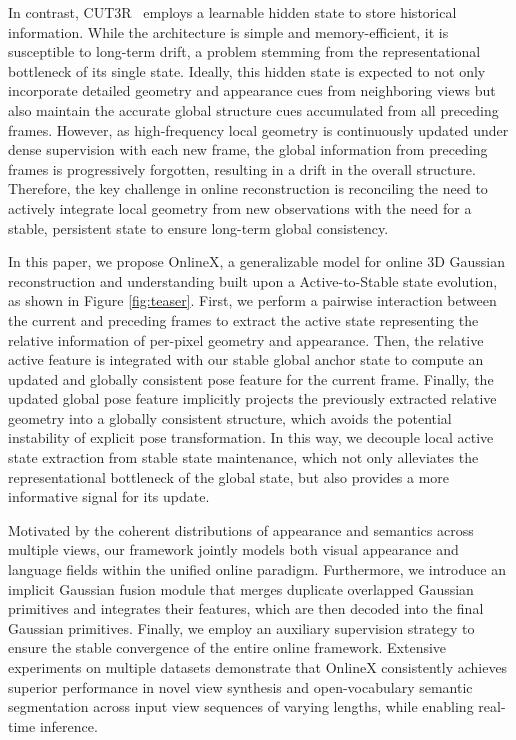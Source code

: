 In contrast, CUT3R~\cite{wang2025continuous} employs a learnable hidden state to store historical information. While the architecture is simple and memory-efficient, it is susceptible to long-term drift, a problem stemming from the representational bottleneck of its single state. Ideally, this hidden state is expected to not only incorporate detailed geometry and appearance cues from neighboring views but also maintain the accurate global structure cues accumulated from all preceding frames. However, as high-frequency local geometry is continuously updated under dense supervision with each new frame, the global information from preceding frames is progressively forgotten, resulting in a drift in the overall structure. Therefore, the key challenge in online reconstruction is reconciling the need to actively integrate local geometry from new observations with the need for a stable, persistent state to ensure long-term global consistency.

In this paper, we propose OnlineX, a generalizable model for online 3D Gaussian reconstruction and understanding built upon a Active-to-Stable state evolution, as shown in Figure \ref{fig:teaser}. First, we perform a pairwise interaction between the current and preceding frames to extract the active state representing the relative information of per-pixel geometry and appearance. Then, the relative active feature is integrated with our stable global anchor state to compute an updated and globally consistent pose feature for the current frame. Finally, the updated global pose feature implicitly projects the previously extracted relative geometry into a globally consistent structure, which avoids the potential instability of explicit pose transformation. In this way, we decouple local active state extraction from stable state maintenance, which not only alleviates the representational bottleneck of the global state, but also provides a more informative signal for its update.

Motivated by the coherent distributions of appearance and semantics across multiple views, our framework jointly models both visual appearance and language fields within the unified online paradigm. Furthermore, we introduce an implicit Gaussian fusion module that merges duplicate overlapped Gaussian primitives and integrates their features, which are then decoded into the final Gaussian primitives. Finally, we employ an auxiliary supervision strategy to ensure the stable convergence of the entire online framework. Extensive experiments on multiple datasets demonstrate that OnlineX consistently achieves superior performance in novel view synthesis and open-vocabulary semantic segmentation across input view sequences of varying lengths, while enabling real-time inference.